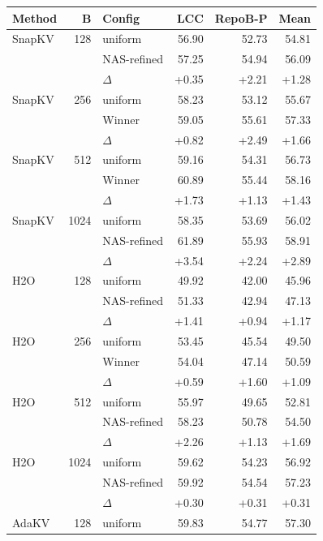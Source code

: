 \begin{table}[tp]
  \centering
  \scriptsize
  \setlength{\tabcolsep}{2.5pt}
  \begin{tabular}{@{}l r l r r r @{}}
    \toprule
    Method & B & Config & LCC & RepoB-P & Mean \\
    \midrule
    SnapKV & 128 & uniform & 56.90 & 52.73 & 54.81 \\
     &  & NAS-refined & 57.25 & 54.94 & 56.09 \\
     &  & $\Delta$ & +0.35 & +2.21 & +1.28 \\
    \midrule
    SnapKV & 256 & uniform & 58.23 & 53.12 & 55.67 \\
     &  & Winner & 59.05 & 55.61 & 57.33 \\
     &  & $\Delta$ & +0.82 & +2.49 & +1.66 \\
    \midrule
    SnapKV & 512 & uniform & 59.16 & 54.31 & 56.73 \\
     &  & Winner & 60.89 & 55.44 & 58.16 \\
     &  & $\Delta$ & +1.73 & +1.13 & +1.43 \\
    \midrule
    SnapKV & 1024 & uniform & 58.35 & 53.69 & 56.02 \\
     &  & NAS-refined & 61.89 & 55.93 & 58.91 \\
     &  & $\Delta$ & +3.54 & +2.24 & +2.89 \\
    \midrule
    H2O & 128 & uniform & 49.92 & 42.00 & 45.96 \\
     &  & NAS-refined & 51.33 & 42.94 & 47.13 \\
     &  & $\Delta$ & +1.41 & +0.94 & +1.17 \\
    \midrule
    H2O & 256 & uniform & 53.45 & 45.54 & 49.50 \\
     &  & Winner & 54.04 & 47.14 & 50.59 \\
     &  & $\Delta$ & +0.59 & +1.60 & +1.09 \\
    \midrule
    H2O & 512 & uniform & 55.97 & 49.65 & 52.81 \\
     &  & NAS-refined & 58.23 & 50.78 & 54.50 \\
     &  & $\Delta$ & +2.26 & +1.13 & +1.69 \\
    \midrule
    H2O & 1024 & uniform & 59.62 & 54.23 & 56.92 \\
     &  & NAS-refined & 59.92 & 54.54 & 57.23 \\
     &  & $\Delta$ & +0.30 & +0.31 & +0.31 \\
    \midrule
    AdaKV & 128 & uniform & 59.83 & 54.77 & 57.30 \\

\end{tabular}
\end{table}
